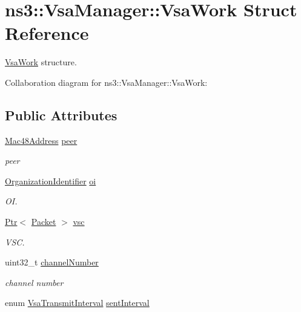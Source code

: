\hypertarget{structns3_1_1VsaManager_1_1VsaWork}{}\section{ns3\+:\+:Vsa\+Manager\+:\+:Vsa\+Work Struct Reference}
\label{structns3_1_1VsaManager_1_1VsaWork}


\hyperlink{structns3_1_1VsaManager_1_1VsaWork}{Vsa\+Work} structure.  




Collaboration diagram for ns3\+:\+:Vsa\+Manager\+:\+:Vsa\+Work\+:
\subsection*{Public Attributes}
\begin{DoxyCompactItemize}
\item 
\hyperlink{classns3_1_1Mac48Address}{Mac48\+Address} \hyperlink{structns3_1_1VsaManager_1_1VsaWork_a0ef676c434e6b0340d37fad0fe19ef77}{peer}
\begin{DoxyCompactList}\small\item\em peer \end{DoxyCompactList}\item 
\hyperlink{classns3_1_1OrganizationIdentifier}{Organization\+Identifier} \hyperlink{structns3_1_1VsaManager_1_1VsaWork_a79c7f68cdc392d3918a45832d9804ed4}{oi}
\begin{DoxyCompactList}\small\item\em OI. \end{DoxyCompactList}\item 
\hyperlink{classns3_1_1Ptr}{Ptr}$<$ \hyperlink{classns3_1_1Packet}{Packet} $>$ \hyperlink{structns3_1_1VsaManager_1_1VsaWork_a11476a604e806a8879f946073e817b4e}{vsc}
\begin{DoxyCompactList}\small\item\em V\+SC. \end{DoxyCompactList}\item 
uint32\+\_\+t \hyperlink{structns3_1_1VsaManager_1_1VsaWork_a83e4289f15a37f16507b7ab115ade42e}{channel\+Number}
\begin{DoxyCompactList}\small\item\em channel number \end{DoxyCompactList}\item 
enum \hyperlink{namespacens3_a417ab130a77d452a8b5014090665bcc1}{Vsa\+Transmit\+Interval} \hyperlink{structns3_1_1VsaManager_1_1VsaWork_afb03c5d6cf5d60df4b143e07b9ef7728}{sent\+Interval}

\end{DoxyCompactItemize}
